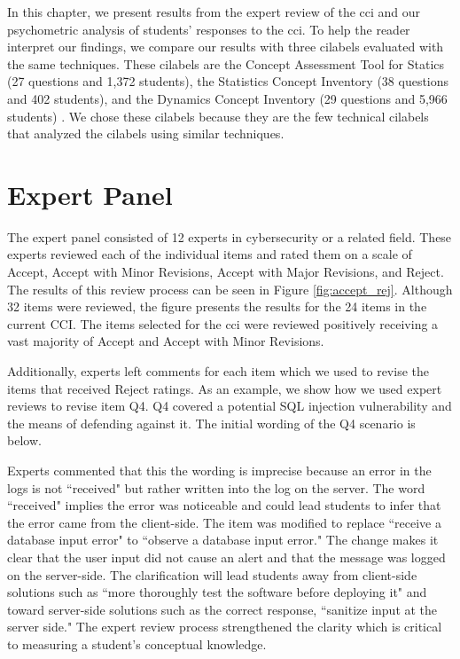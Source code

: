 In this chapter, we present results from the expert review of the \gls{cci} and our psychometric analysis of students' responses to the \gls{cci}. To help the reader interpret our findings, we compare our results with three \glspl{cilabel} evaluated with the same techniques. These \glspl{cilabel} are the Concept Assessment Tool for Statics (27 questions and 1,372 students), the Statistics Concept Inventory (38 questions and 402 students), and the Dynamics Concept Inventory (29 questions and 5,966 students) \cite{jorian}. We chose these \glspl{cilabel} because they are the few technical \glspl{cilabel} that analyzed the \glspl{cilabel} using similar techniques. 

\section{Expert Panel}


The expert panel consisted of 12 experts in cybersecurity or a related field. These experts reviewed each of the individual items and rated them on a scale of Accept, Accept with Minor Revisions, Accept with Major Revisions, and Reject. The results of this review process can be seen in Figure \ref{fig:accept_rej}. Although 32 items were reviewed, the figure presents the results for the 24 items in the current CCI. The items selected for the \gls{cci} were reviewed positively receiving a vast majority of Accept and Accept with Minor Revisions.

Additionally, experts left comments for each item which we used to revise the items that received Reject ratings. As an example, we show how we used expert reviews to revise item Q4. Q4 covered a potential SQL injection vulnerability and the means of defending against it. The initial wording of the Q4 scenario is below.

\begin{quotation}
\end{quotation}


Experts commented that this the wording is imprecise because an error in the logs is not ``received" but rather written into the log on the server. The word ``received" implies the error was noticeable and could lead students to infer that the error came from the client-side. The item was modified to replace ``receive a database input error" to ``observe a database input error." The change makes it clear that the user input did not cause an alert and that the message was logged on the server-side. The clarification will lead students away from client-side solutions such as ``more thoroughly test the software before deploying it" and toward server-side solutions such as the correct response, ``sanitize input at the server side." The expert review process strengthened the clarity which is critical to measuring a student's conceptual knowledge.

